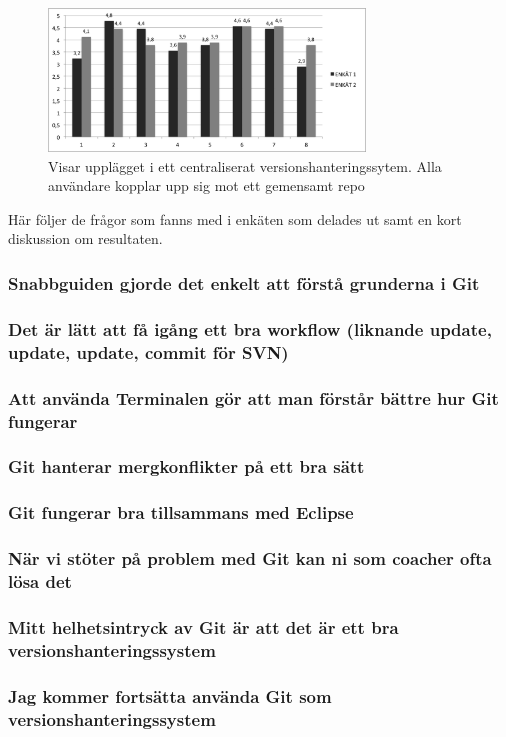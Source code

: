 \begin{figure}[htb!]\centering\includegraphics[width=0.75\textwidth]{EnkatResultatMindre.png}\caption{Visar upplägget i ett centraliserat versionshanteringssytem. Alla användare kopplar upp sig mot ett gemensamt repo}\label{fig:enkat}\end{figure}

Här följer de frågor som fanns med i enkäten som delades ut samt en kort diskussion om resultaten.

\subsubsection{Snabbguiden gjorde det enkelt att förstå grunderna i Git}

\subsubsection{Det är lätt att få igång ett bra workflow (liknande update, update, update, commit för SVN)}


\subsubsection{Att använda Terminalen gör att man förstår bättre hur Git fungerar}


\subsubsection{Git hanterar mergkonflikter på ett bra sätt}


\subsubsection{Git fungerar bra tillsammans med Eclipse}


\subsubsection{När vi stöter på problem med Git kan ni som coacher ofta lösa det}


\subsubsection{Mitt helhetsintryck av Git är att det är ett bra versionshanteringssystem}


\subsubsection{Jag kommer fortsätta använda Git som versionshanteringssystem}
